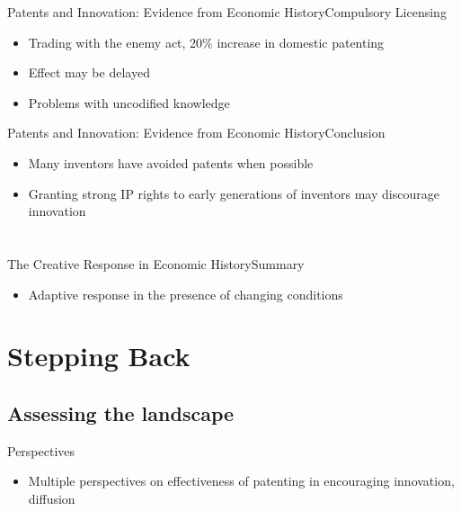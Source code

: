 \documentclass{beamer}
\begin{document}
\begin{frame}{Patents and Innovation: Evidence from Economic History}{Compulsory Licensing}
\begin{itemize}
\item{Trading with the enemy act, 20\% increase in domestic patenting}
\item{Effect may be delayed}
\item{Problems with uncodified knowledge}
\end{itemize}
\end{frame}

\begin{frame}{Patents and Innovation: Evidence from Economic History}{Conclusion}
\begin{itemize}
\item{Many inventors have avoided patents when possible}
\item{Granting strong IP rights to early generations of inventors may discourage innovation}
\end{itemize}
\end{frame}


\section{\cite{Schumpeter1947}}
\begin{frame}{The Creative Response in Economic History}{Summary}
\begin{itemize}
\item{Adaptive response in the presence of changing conditions}
\end{itemize}
\end{frame}

\section{Stepping Back}
\subsection{Assessing the landscape}
\begin{frame}{Perspectives}{}
\begin{itemize}
\item{Multiple perspectives on effectiveness of patenting in encouraging innovation, diffusion}
\end{itemize}
\end{frame}




\end{document}
